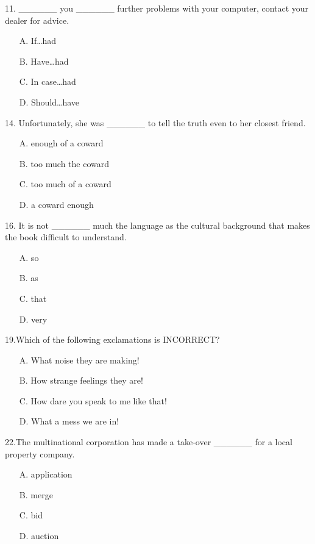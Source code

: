 \documentclass[UTF8,11pt]{ctexart}
\begin{document}
11. \_\_\_\_\_\_ you \_\_\_\_\_\_ further problems with your computer, contact your dealer for advice.


\begin{itemize}[leftmargin=2em,itemsep=.2em,topsep=.4em]\item[A.] If…had
\item[B.] Have…had
\item[C.] In case…had
\item[D.] Should…have
\end{itemize}

14. Unfortunately, she was \_\_\_\_\_\_ to tell the truth even to her closest friend.


\begin{itemize}[leftmargin=2em,itemsep=.2em,topsep=.4em]\item[A.] enough of a coward
\item[B.] too much the coward
\item[C.] too much of a coward
\item[D.] a coward enough
\end{itemize}

16. It is not \_\_\_\_\_\_ much the language as the cultural background that makes the book difficult to understand.


\begin{itemize}[leftmargin=2em,itemsep=.2em,topsep=.4em]\item[A.] so
\item[B.] as
\item[C.] that
\item[D.] very
\end{itemize}

19.Which of the following exclamations is INCORRECT?


\begin{itemize}[leftmargin=2em,itemsep=.2em,topsep=.4em]\item[A.] What noise they are making!
\item[B.] How strange feelings they are!
\item[C.] How dare you speak to me like that!
\item[D.] What a mess we are in!
\end{itemize}

22.The multinational corporation has made a take-over \_\_\_\_\_\_ for a local property company.


\begin{itemize}[leftmargin=2em,itemsep=.2em,topsep=.4em]\item[A.] application
\item[B.] merge
\item[C.] bid
\item[D.] auction
\end{itemize}
\end{document}
